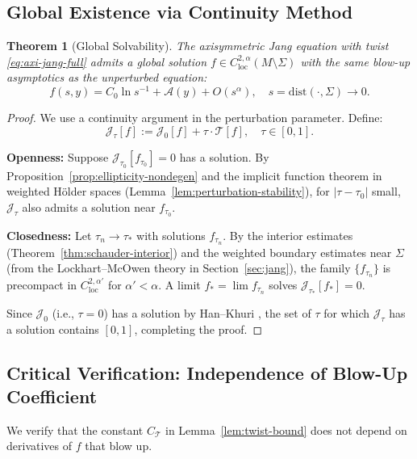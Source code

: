 \documentclass[12pt]{article}
\theoremstyle{plain}
\newtheorem{theorem}{Theorem}[section]
\theoremstyle{definition}
\theoremstyle{remark}
\begin{document}
\subsection{Global Existence via Continuity Method}

\begin{theorem}[Global Solvability]\label{thm:global-exist-schauder}
The axisymmetric Jang equation with twist \eqref{eq:axi-jang-full} admits a global solution $f \in C^{2,\alpha}_{\mathrm{loc}}(M \setminus \Sigma)$ with the same blow-up asymptotics as the unperturbed equation:
\[
f(s, y) = C_0 \ln s^{-1} + \mathcal{A}(y) + O(s^{\alpha}), \quad s = \mathrm{dist}(\cdot, \Sigma) \to 0.
\]
\end{theorem}

\begin{proof}
We use a continuity argument in the perturbation parameter. Define:
\[
\mathcal{J}_\tau[f] := \mathcal{J}_0[f] + \tau \cdot \mathcal{T}[f], \quad \tau \in [0, 1].
\]

\textbf{Openness:} Suppose $\mathcal{J}_{\tau_0}[f_{\tau_0}] = 0$ has a solution. By Proposition~\ref{prop:ellipticity-nondegen} and the implicit function theorem in weighted H\"older spaces (Lemma~\ref{lem:perturbation-stability}), for $|\tau - \tau_0|$ small, $\mathcal{J}_\tau$ also admits a solution near $f_{\tau_0}$.

\textbf{Closedness:} Let $\tau_n \to \tau_*$ with solutions $f_{\tau_n}$. By the interior estimates (Theorem~\ref{thm:schauder-interior}) and the weighted boundary estimates near $\Sigma$ (from the Lockhart--McOwen theory in Section~\ref{sec:jang}), the family $\{f_{\tau_n}\}$ is precompact in $C^{2,\alpha'}_{\mathrm{loc}}$ for $\alpha' < \alpha$. A limit $f_* = \lim f_{\tau_n}$ solves $\mathcal{J}_{\tau_*}[f_*] = 0$.

Since $\mathcal{J}_0$ (i.e., $\tau = 0$) has a solution by Han--Khuri \cite{hankhuri2013}, the set of $\tau$ for which $\mathcal{J}_\tau$ has a solution contains $[0, 1]$, completing the proof.
\end{proof}

\subsection{Critical Verification: Independence of Blow-Up Coefficient}

We verify that the constant $C_\mathcal{T}$ in Lemma~\ref{lem:twist-bound} does not depend on derivatives of $f$ that blow up.
\end{document}
